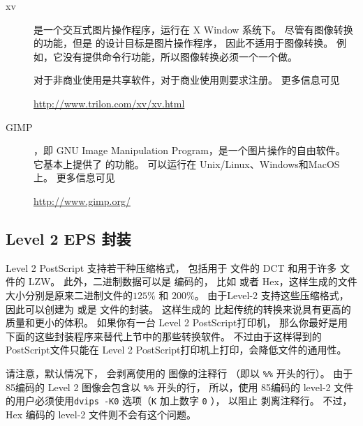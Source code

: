 \begin{description}
	\item[xv]
	
	 是一个交互式图片操作程序，运行在 X Window 系统下。
	尽管有图像转换的功能，但是  的设计目标是图片操作程序，
	因此不适用于图像转换。
	例如，它没有提供命令行功能，所以图像转换必须一个一个做。
	
	 对于非商业使用是共享软件，对于商业使用则要求注册。
	更多信息可见
	\begin{center}
		\url{http://www.trilon.com/xv/xv.html}
	\end{center}
	
	\item[GIMP]	
	
	，即 GNU Image Manipulation Program，是一个图片操作的自由软件。
	它基本上提供了   的功能。
	 可以运行在 Unix/Linux、Windows和MacOS上。
	更多信息可见
	\begin{center}
		\url{http://www.gimp.org/}
	\end{center}

\end{description}


\subsection{Level 2 EPS 封装}\label{ssec:epswrapper}
Level 2 PostScript 支持若干种压缩格式，
包括用于  文件的 DCT 和用于许多  文件的 LZW。
此外，二进制数据可以是 \ascii 编码的，
比如  或者 \ascii Hex，这样生成的\ascii 文件大小分别是原来二进制文件的$125\percent$ 和 $200\percent$。
由于Level-2 支持这些压缩格式，
因此可以创建为  或是  文件的封装。
这样生成的  比起传统的转换来说具有更高的质量和更小的体积。
如果你有一台 Level 2 PostScript打印机，
那么你最好是用下面的这些封装程序来替代上节中的那些转换软件。
不过由于这样得到的PostScript文件只能在 Level 2 PostScript打印机上打印，会降低文件的通用性。

请注意，默认情况下， 会剥离使用的  图像的注释行
（即以 \texttt{\%\%} 开头的行）。
由于\ascii85编码的 Level 2 图像会包含以 \texttt{\%\%} 开头的行，
所以，使用 \ascii85编码的 level-2  文件的用户必须使用\verb|dvips -K0| 选项（\texttt{K} 加上数字 \texttt{0} ），
以阻止  剥离注释行。
不过，\ascii Hex 编码的 level-2 文件则不会有这个问题。

